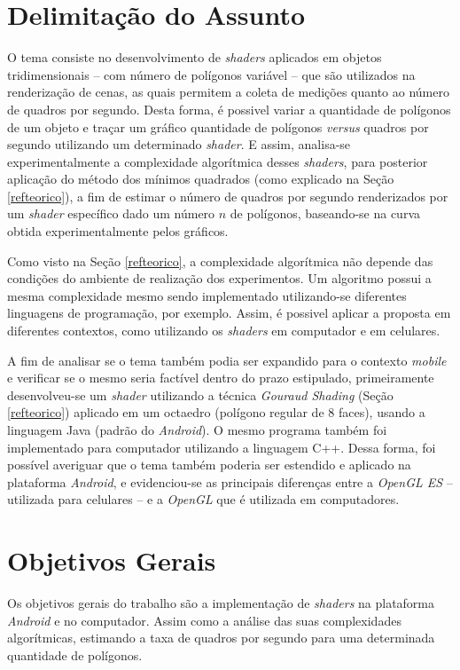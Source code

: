 \section{Delimitação do Assunto}

O tema consiste no desenvolvimento de \textit{shaders} aplicados em objetos tridimensionais -- com número de polígonos variável -- que são utilizados na renderização de cenas, as quais permitem a coleta de medições quanto ao número de quadros por segundo. Desta forma, é possivel variar a quantidade de polígonos de um objeto e traçar um gráfico quantidade de polígonos \textit{versus} quadros por segundo utilizando um determinado \textit{shader}. E assim, analisa-se experimentalmente a complexidade algorítmica desses \textit{shaders}, para posterior aplicação do método dos mínimos quadrados (como explicado na Seção \ref{refteorico}), a fim de estimar o número de quadros por segundo renderizados por um \textit{shader} específico dado um número $n$ de polígonos, baseando-se na curva obtida experimentalmente pelos gráficos.  

Como visto na Seção \ref{refteorico}, a complexidade algorítmica não depende das condições do ambiente de realização dos experimentos. Um algoritmo possui a mesma complexidade mesmo sendo implementado utilizando-se diferentes linguagens de programação, por exemplo. Assim, é possivel aplicar a proposta em diferentes contextos, como utilizando os \textit{shaders} em computador e em celulares. 

A fim de analisar se o tema também podia ser expandido para o contexto \textit{mobile} e verificar se o mesmo seria factível dentro do prazo estipulado, primeiramente desenvolveu-se um \textit{shader} utilizando a técnica \textit{Gouraud Shading} (Seção \ref{refteorico}) aplicado em um octaedro (polígono regular de 8 faces), usando a linguagem Java (padrão do \textit{Android}). O mesmo programa também foi implementado para computador utilizando a linguagem C++.  Dessa forma, foi possível averiguar que o tema também poderia ser estendido e aplicado na plataforma \textit{Android}, e evidenciou-se as principais diferenças entre a \textit{OpenGL ES} -- utilizada para celulares -- e a \textit{OpenGL} que é utilizada em computadores. 

\section{Objetivos Gerais}

Os objetivos gerais do trabalho são a implementação de \textit{shaders} na plataforma \textit{Android} e no computador. Assim como a análise das suas complexidades algorítmicas, estimando a taxa de quadros por segundo para uma determinada quantidade de polígonos.


